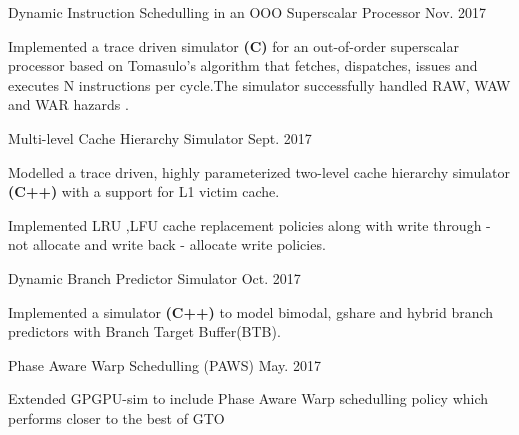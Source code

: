 \begin{cvprojects}
    \cvproject
    {Dynamic Instruction Schedulling in an OOO Superscalar Processor }
    {\color{darkgray}Nov. 2017}
    {
      \begin{cvprojectitems}
        \item {Implemented a trace driven simulator \textbf{(C)} for an out-of-order superscalar processor based on Tomasulo’s algorithm that fetches, dispatches, issues and executes N instructions per cycle.The simulator successfully handled RAW, WAW and WAR hazards .}
      \end{cvprojectitems}
    }

    \cvproject
    {Multi-level Cache Hierarchy Simulator }
    {\color{darkgray}Sept. 2017}
    {
      \begin{cvprojectitems}
        \item {Modelled a trace driven, highly parameterized two-level cache hierarchy simulator \textbf{(C++)} with a support for L1 victim cache. }
        \item {Implemented LRU ,LFU cache replacement policies along with write through - not allocate and write back - allocate write policies.} 
      \end{cvprojectitems}
    }

    \cvproject
    {Dynamic Branch Predictor Simulator }
    {\color{darkgray}Oct. 2017}
    {
      \begin{cvprojectitems1}
        \item {Implemented a simulator \textbf{(C++)} to model bimodal, gshare and hybrid branch predictors with Branch Target Buffer(BTB). }
      \end{cvprojectitems1}
    }
    \par\addvspace{-1ex}
     \cvproject
    {Phase Aware Warp Schedulling (PAWS) }
    {\color{darkgray}May. 2017}
    { \begin{cvprojectitems1}
        \item {Extended GPGPU-sim to include Phase Aware Warp schedulling policy which performs closer to the best of GTO }
      \end{cvprojectitems1}
    }

\end{cvprojects}